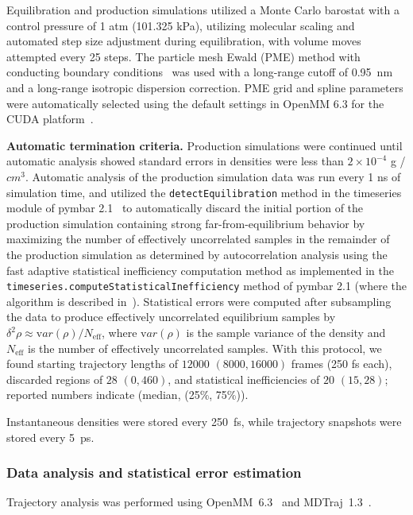 \documentclass[aps,pre,twocolumn,nofootinbib,superscriptaddress,linenumbers]{revtex4-1}
\newcommand{\var}[1]{{\mathrm var}{(#1)}}
\begin{document}
Equilibration and production simulations utilized a Monte Carlo barostat with a control pressure of 1 atm (101.325 kPa), utilizing molecular scaling and automated step size adjustment during equilibration, with volume moves attempted every 25 steps.  
The particle mesh Ewald (PME) method with conducting boundary conditions~\cite{Darden1993} was used with a long-range cutoff of 0.95~nm and a long-range isotropic dispersion correction. 
PME grid and spline parameters were automatically selected using the default settings in OpenMM 6.3 for the CUDA platform~\cite{eastman2012openmm}.

{\bf Automatic termination criteria.}
Production simulations were continued until automatic analysis showed standard errors in densities were less than $2 \times 10^{-4}$ g / $cm^{3}$.
Automatic analysis of the production simulation data was run every 1 ns of simulation time, and utilized the {\tt detectEquilibration} method in the timeseries module of pymbar 2.1~\cite{shirts2008statistically} to automatically discard the initial portion of the production simulation containing strong far-from-equilibrium behavior by maximizing the number of effectively uncorrelated samples in the remainder of the production simulation as determined by autocorrelation analysis using the fast adaptive statistical inefficiency computation method as implemented in the {\tt timeseries.computeStatisticalInefficiency} method of pymbar 2.1 (where the algorithm is described in~\cite{chodera2007}).
Statistical errors were computed after subsampling the data to produce effectively uncorrelated equilibrium samples by $\delta^2 \rho \approx \var{\rho} / N_\mathrm{eff}$, where $\var{\rho}$ is the sample variance of the density and $N_\mathrm{eff}$ is the number of effectively uncorrelated samples.  
With this protocol, we found starting trajectory lengths of $12000$ $(8000, 16000)$ frames (250 fs each), discarded regions of $28$  $(0, 460)$, and statistical inefficiencies of $20$ $(15, 28)$; reported numbers indicate (median, (25\%, 75\%)).  

Instantaneous densities were stored every 250~fs, while trajectory snapshots were stored every 5~ps.  

\subsubsection{Data analysis and statistical error estimation}

Trajectory analysis was performed using OpenMM~6.3~\cite{eastman2012openmm} and MDTraj~1.3~\cite{mcgibbon2014mdtraj}.  
\end{document}
